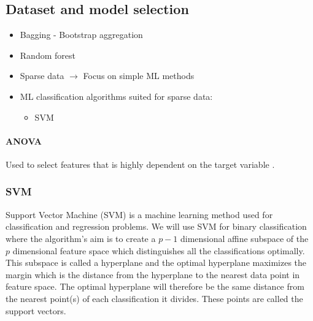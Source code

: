\subsection{Dataset and model selection}
\begin{itemize}
    \item Bagging - Bootstrap aggregation
    \item Random forest
\end{itemize}

\begin{itemize}
    \item Sparse data $ \rightarrow $ Focus on simple ML methods
    \item ML classification algorithms suited for sparse data: 
        \begin{itemize}
            \item SVM
        \end{itemize}
        
\end{itemize}



\paragraph{ANOVA} 
Used to select features that is highly dependent on the target variable
\cite{anova}. 











\subsubsection{SVM}
Support Vector Machine (SVM) is a machine learning method used for 
classification and regression problems. We will use SVM for binary 
classification where the algorithm's aim is to create a $p-1$ dimensional
affine subspace of the $p$ dimensional feature space which distinguishes all the 
classifications optimally. This subspace is called a hyperplane and the 
optimal hyperplane maximizes the margin which is the distance from the 
hyperplane to the nearest data point in feature space. The optimal hyperplane 
will therefore be the same distance from the nearest point(s) of each 
classification it divides. These points are called the support vectors.

